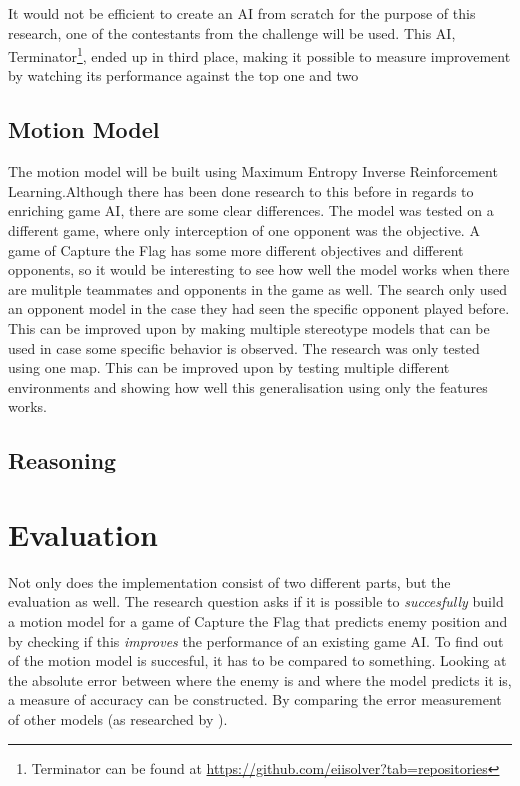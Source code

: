 \documentclass[a4paper, 12pt]{article}
\begin{document}
It would not be efficient to create an AI from scratch for the purpose of
this research, one of the contestants from the challenge will be
used. This AI, Terminator\footnote{Terminator can be found at \url{https://github.com/eiisolver?tab=repositories}}, ended up in third place, making it possible to
measure improvement by watching its performance against the top one and two

\subsection{Motion Model}
The motion model will be built using Maximum Entropy Inverse Reinforcement
Learning.Although there has been done research to this before \citep{6374144}
in regards to enriching game AI, there are some clear differences. 
The model was tested on a different game, where only interception of one
opponent was the objective. A game of Capture the Flag has some more different
objectives and different opponents, so it would be interesting to see how well
the model works when there are mulitple teammates and opponents in the game as
well.
The search only used an opponent model in the case they had seen the specific
opponent played before. This can be improved upon by making multiple stereotype
models that can be used in case some specific behavior is observed. 
The research was only tested using one map. This can be improved upon by testing
multiple different environments and showing how well this generalisation using
only the features works.
\subsection{Reasoning}

\section{Evaluation}
Not only does the implementation consist of two different parts, but the evaluation as well. The
research question asks if it is possible to \emph{succesfully} build a motion
model for a game of Capture the Flag that predicts enemy position and by
checking if this \emph{improves} the performance of an existing game AI. To
find out of the motion model is succesful, it has to be compared to something.
Looking at the absolute error between where the enemy is and where the model
predicts it is, a measure of accuracy can be constructed. By comparing the error
measurement of other models (as researched by \citep{Hladky_anevaluation}
\citep{weber2011aiide} \citep{Laird:2001:KYG:375735.376343} \citep{6374144}).
\end{document}
